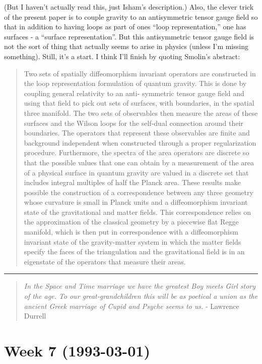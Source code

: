 \documentclass{article}
\begin{document}
(But I haven't actually read this, just Isham's description.) Also, the
clever trick of the present paper is to couple gravity to an
antisymmetric tensor gauge field so that in addition to having loops as
part of ones ``loop representation,'' one has surfaces - a ``surface
representation''. But this antisymmetric tensor gauge field is not the
sort of thing that actually seems to arise in physics (unless I'm
missing something). Still, it's a start. I think I'll finish by quoting
Smolin's abstract:

\begin{quote}
Two sets of spatially diffeomorphism invariant operators are constructed
in the loop representation formulation of quantum gravity. This is done
by coupling general relativity to an anti- symmetric tensor gauge field
and using that field to pick out sets of surfaces, with boundaries, in
the spatial three manifold. The two sets of observables then measure the
areas of these surfaces and the Wilson loops for the self-dual
connection around their boundaries. The operators that represent these
observables are finite and background independent when constructed
through a proper regularization procedure. Furthermore, the spectra of
the area operators are discrete so that the possible values that one can
obtain by a measurement of the area of a physical surface in quantum
gravity are valued in a discrete set that includes integral multiples of
half the Planck area. These results make possible the construction of a
correspondence between any three geometry whose curvature is small in
Planck units and a diffeomorphism invariant state of the gravitational
and matter fields. This correspondence relies on the approximation of
the classical geometry by a piecewise flat Regge manifold, which is then
put in correspondence with a diffeomorphism invariant state of the
gravity-matter system in which the matter fields specify the faces of
the triangulation and the gravitational field is in an eigenstate of the
operators that measure their areas.
\end{quote}

\begin{center}\rule{0.5\linewidth}{0.5pt}\end{center}

\begin{quote}
\emph{In the Space and Time marriage we have the greatest Boy meets Girl
story of the age. To our great-grandchildren this will be as poetical a
union as the ancient Greek marriage of Cupid and Psyche seems to us.} -
Lawrence Durrell
\end{quote}
\hypertarget{week-7-1993-03-01}{%
\section{Week 7 (1993-03-01)}\label{week-7-1993-03-01}}
\end{document}

